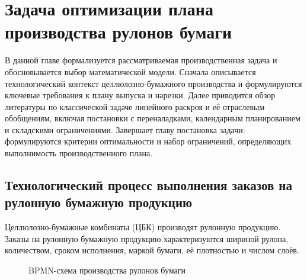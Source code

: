 \chapter{Задача оптимизации плана производства рулонов бумаги}\label{ch:theor_ch}
В данной главе формализуется рассматриваемая производственная задача и обосновывается выбор математической модели.
Сначала описывается технологический контекст целлюлозно-бумажного производства и формулируются ключевые требования к плану выпуска и нарезки.
Далее приводится обзор литературы по классической задаче линейного раскроя и её отраслевым обобщениям, включая постановки с переналадками, календарным планированием и складскими ограничениями.
Завершает главу постановка задачи: формулируются критерии оптимальности и набор ограничений, определяющих выполнимость производственного плана.

\section{Технологический процесс выполнения заказов на рулонную бумажную продукцию}\label{sec:theor_ch/problem_description}
Целлюлозно-бумажные комбинаты (ЦБК) производят рулонную продукцию. 
Заказы на рулонную бумажную продукцию характеризуются шириной рулона, количеством, сроком исполнения, маркой бумаги, её плотностью и числом слоёв.

\begin{figure}
    \resizebox{\textwidth}{!}{
        
    }
    \caption{BPMN-схема производства рулонов бумаги}
    \label{fig:production_chain}
\end{figure}

